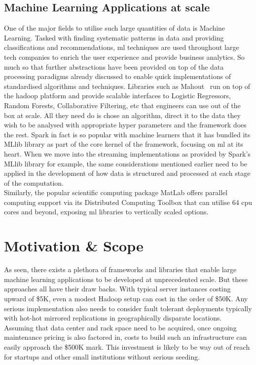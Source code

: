\documentclass[a4paper,11pt]{scrreprt}
\begin{document}
\section{Machine Learning Applications at scale}
One of the major fields to utilise such large quantities of data is Machine Learning. Tasked with finding systematic patterns in data and providing classifications and recommendations, \acrshort{ml} techniques are used throughout large tech companies to enrich the user experience and provide business analytics. So much so that further abstractions have been provided on top of the data processing paradigms already discussed to enable quick implementations of standardised algorithms and techniques. Libraries such as Mahout~\cite{mahout-site} run on top of the hadoop platform and provide scalable interfaces to Logistic Regressors, Random Forests, Collaborative Filtering, etc that engineers can use out of the box at scale. All they need do is chose an algorithm, direct it to the data they wish to be analysed with appropriate hyper parameters and the framework does the rest. Spark in fact is so popular with machine learners that it has bundled its MLlib library as part of the core kernel of the framework, focusing on \acrshort{ml} at its heart. When we move into the streaming implementations as provided by Spark's MLlib library for example, the same considerations mentioned earlier need to be applied in the development of how data is structured and processed at each stage of the computation.\\

Similarly, the popular scientific computing package MatLab offers parallel computing support via its Distributed Computing Toolbox that can utilise 64 \acrshort{cpu} cores and beyond, exposing \acrshort{ml} libraries to vertically scaled options.

\chapter{Motivation \& Scope}
As seen, there exists a plethora of frameworks and libraries that enable large machine learning applications to be developed at unprecedented scale. But these approaches all have their draw backs. With typical server instances costing upward of \$5K, even a modest Hadoop setup can cost in the order of \$50K. Any serious implementation also needs to consider fault tolerant deployments typically with hot-hot mirrored replications in geographically disparate locations. Assuming that data center and rack space need to be acquired, once ongoing maintenance pricing is also factored in, costs to build such an infrastructure can easily approach the \$500K mark. This investment is likely to be way out of reach for startups and other small institutions without serious seeding.
\end{document}
